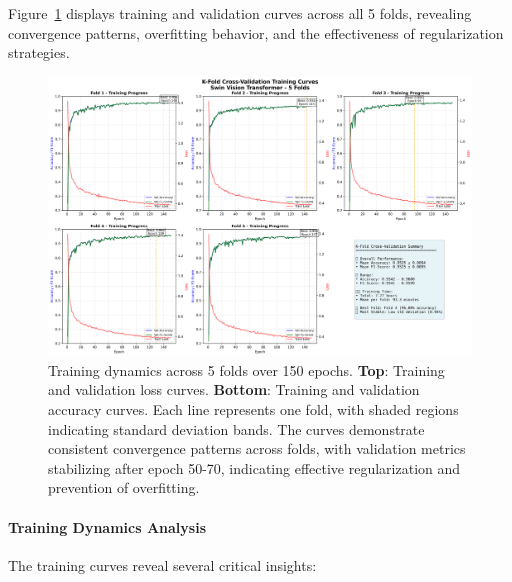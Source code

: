 \documentclass[11pt,a4paper]{article}
\begin{document}
Figure~\ref{fig:training_curves} displays training and validation curves across all 5 folds, revealing convergence patterns, overfitting behavior, and the effectiveness of regularization strategies.

\begin{figure}[H]
  \centering
  \includegraphics[width=.95\linewidth]{images/kfold_training_curves.png}
  \caption{Training dynamics across 5 folds over 150 epochs. \textbf{Top}: Training and validation loss curves. \textbf{Bottom}: Training and validation accuracy curves. Each line represents one fold, with shaded regions indicating standard deviation bands. The curves demonstrate consistent convergence patterns across folds, with validation metrics stabilizing after epoch 50-70, indicating effective regularization and prevention of overfitting.}
  \label{fig:training_curves}
\end{figure}

\paragraph{Training Dynamics Analysis}
The training curves reveal several critical insights:
\end{document}
